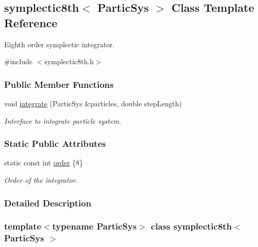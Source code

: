 \hypertarget{classsymplectic8th}{}\subsection{symplectic8th$<$ Partic\+Sys $>$ Class Template Reference}
\label{classsymplectic8th}


Eighth order symplectic integrator.  




{\ttfamily \#include $<$symplectic8th.\+h$>$}

\subsubsection*{Public Member Functions}
\begin{DoxyCompactItemize}
\item 
void \mbox{\hyperlink{classsymplectic8th_ab00fe2604c1471a27c2e6301c3820343}{integrate}} (Partic\+Sys \&particles, double step\+Length)
\begin{DoxyCompactList}\small\item\em Interface to integrate particle system. \end{DoxyCompactList}\end{DoxyCompactItemize}
\subsubsection*{Static Public Attributes}
\begin{DoxyCompactItemize}
\item 
static const int \mbox{\hyperlink{classsymplectic8th_a5f80ae81362e3542cb9ed7653f1b20d6}{order}} \{8\}
\begin{DoxyCompactList}\small\item\em Order of the integrator. \end{DoxyCompactList}\end{DoxyCompactItemize}


\subsubsection{Detailed Description}
\subsubsection*{template$<$typename Partic\+Sys$>$\newline
class symplectic8th$<$ Partic\+Sys $>$}

